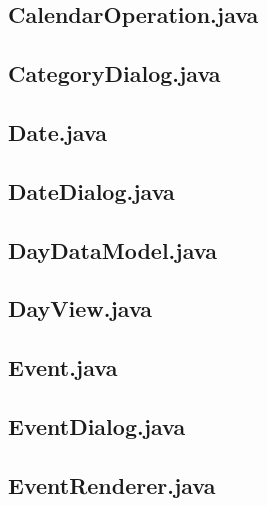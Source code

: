 \documentclass{article}
\begin{document}


\subsection{CalendarOperation.java}



\subsection{CategoryDialog.java}



\subsection{Date.java}



\subsection{DateDialog.java}



\subsection{DayDataModel.java}



\subsection{DayView.java}



\subsection{Event.java}



\subsection{EventDialog.java}



\subsection{EventRenderer.java}
\end{document}

